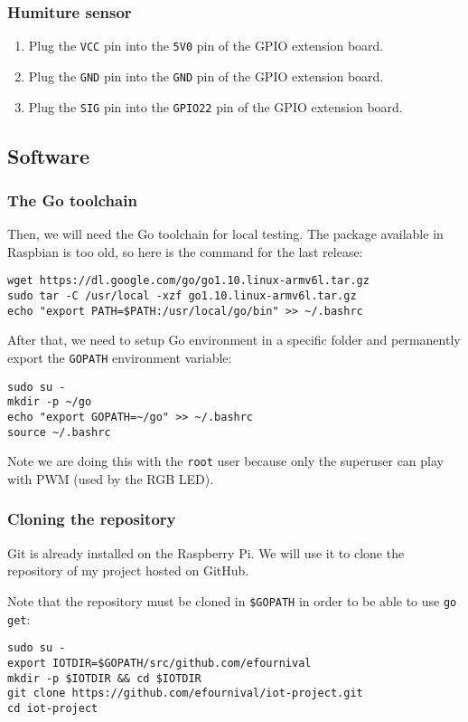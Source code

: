 \documentclass[11pt,a4paper]{article}
\newcommand{\rpi}{Raspberry Pi\xspace}
\newcommand{\plugmodule}[2]{Plug the \texttt{#1} pin into the \texttt{#2} pin of the GPIO extension board.}
\begin{document}
\subsubsection{Humiture sensor}
\begin{enumerate}
  \item	\plugmodule{VCC}{5V0}
  \item \plugmodule{GND}{GND}
  \item	\plugmodule{SIG}{GPIO22}
\end{enumerate}

\subsection{Software}

\subsubsection{The Go toolchain}
Then, we will need the Go toolchain for local testing. The package available in Raspbian is too old, so here is the command for the last release:
\begin{verbatim}
wget https://dl.google.com/go/go1.10.linux-armv6l.tar.gz
sudo tar -C /usr/local -xzf go1.10.linux-armv6l.tar.gz
echo "export PATH=$PATH:/usr/local/go/bin" >> ~/.bashrc
\end{verbatim}

After that, we need to setup Go environment in a specific folder and permanently export the \texttt{GOPATH} environment variable:
\begin{verbatim}
sudo su -
mkdir -p ~/go
echo "export GOPATH=~/go" >> ~/.bashrc
source ~/.bashrc
\end{verbatim}

Note we are doing this with the \texttt{root} user because only the superuser can play with PWM (used by the RGB LED).

\subsubsection{Cloning the repository}
Git is already installed on the \rpi. We will use it to clone the repository of my project hosted on GitHub.

Note that the repository must be cloned in \verb|$GOPATH| in order to be able to use \texttt{go get}:
\begin{verbatim}
sudo su -
export IOTDIR=$GOPATH/src/github.com/efournival
mkdir -p $IOTDIR && cd $IOTDIR
git clone https://github.com/efournival/iot-project.git
cd iot-project
\end{verbatim}
\end{document}
